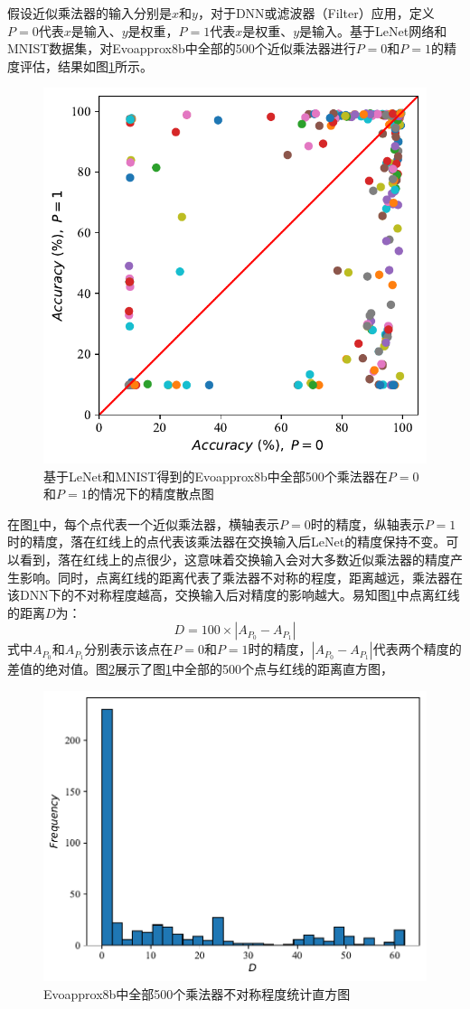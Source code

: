 假设近似乘法器的输入分别是$x$和$y$，对于DNN或滤波器（Filter）应用，定义$P=0$代表$x$是输入、$y$是权重，$P=1$代表$x$是权重、$y$是输入。基于LeNet网络和MNIST数据集\cite{DNN:LeNet_MNIST}，对Evoapprox8b\cite{AC:AM:CGP_Evoapprox8b}中全部的500个近似乘法器进行$P=0$和$P=1$的精度评估，结果如图\ref{AC:AM:Adapt:Fig:Evo8_accuracy_P}所示。
\begin{figure}[!htb]
    \centering
    \includegraphics[width=0.7\linewidth]{./figs/AC-AM-Adapt-Evo8_accuracy_P.pdf}
    \caption{基于LeNet和MNIST得到的Evoapprox8b中全部500个乘法器在$P=0$和$P=1$的情况下的精度散点图}
    \label{AC:AM:Adapt:Fig:Evo8_accuracy_P}
\end{figure}
在图\ref{AC:AM:Adapt:Fig:Evo8_accuracy_P}中，每个点代表一个近似乘法器，横轴表示$P=0$时的精度，纵轴表示$P=1$时的精度，落在红线上的点代表该乘法器在交换输入后LeNet的精度保持不变。可以看到，落在红线上的点很少，这意味着交换输入会对大多数近似乘法器的精度产生影响。同时，点离红线的距离代表了乘法器不对称的程度，距离越远，乘法器在该DNN下的不对称程度越高，交换输入后对精度的影响越大。易知图\ref{AC:AM:Adapt:Fig:Evo8_accuracy_P}中点离红线的距离$D$为：
\begin{equation}
    \label{AC:AM:Adapt:Eq:Evo8_D}
      D =  100 \times | A_{P_0} - A_{P_1} |
\end{equation} 
式中$A_{P_0}$和$A_{P_1}$分别表示该点在$P=0$和$P=1$时的精度，$| A_{P_0} - A_{P_1} |$代表两个精度的差值的绝对值。图\ref{AC:AM:Adapt:Fig:Evo8_D}展示了图\ref{AC:AM:Adapt:Fig:Evo8_accuracy_P}中全部的500个点与红线的距离直方图，
\begin{figure}[!ht]
    \centering
    \includegraphics[width=0.7\linewidth]{./figs/AC-AM-Adapt-Evo8_D.pdf}
    \caption{Evoapprox8b中全部500个乘法器不对称程度统计直方图}
    \label{AC:AM:Adapt:Fig:Evo8_D}
\end{figure}
